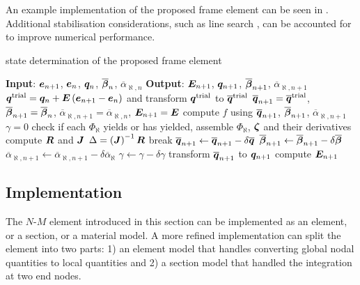 An example implementation of the proposed frame element can be seen in .
Additional stabilisation considerations, such as line search \cite{Dutko1993}, can be accounted for to improve numerical performance.
\begin{breakablealgorithm}
\caption{state determination of the proposed frame element}\label{algo:beam_model}
\begin{algorithmic}
\State \textbf{Input}: $\bm{e}_{n+1}$, $\bm{e}_n$, $\bm{q}_n$, $\overline{\bm{\beta}}_n$, $\overline{\alpha}_{\aleph,n}$
\State \textbf{Output}: $\bm{E}_{n+1}$, $\bm{q}_{n+1}$, $\overline{\bm{\beta}}_{n+1}$, $\overline{\alpha}_{\aleph,n+1}$
\State $\bm{q}^\text{trial}=\bm{q}_n+\bm{E}\left(\bm{e}_{n+1}-\bm{e}_n\right)$ and transform $\bm{q}^\text{trial}$ to $\overline{\bm{q}}^\text{trial}$
\State $\overline{\bm{q}}_{n+1}=\overline{\bm{q}}^\text{trial}$, $\overline{\bm{\beta}}_{n+1}=\overline{\bm{\beta}}_n$, $\overline{\alpha}_{\aleph,n+1}=\overline{\alpha}_{\aleph,n}$, $\bm{E}_{n+1}=\bm{E}$
\State compute $f$ using $\overline{\bm{q}}_{n+1}$, $\overline{\bm{\beta}}_{n+1}$, $\overline{\alpha}_{\aleph,n+1}$
\State $\gamma=0$
\State check if each $\Phi_\aleph$ yields or has yielded, assemble $\Phi_\aleph$, $\bm{\zeta}$ and their derivatives
\State compute $\bm{R}$ and $\bm{J}$
\State $\Delta=\left(\bm{J}\right)^{-1}\bm{R}$
\State break
\EndIf
\State $\overline{\bm{q}}_{n+1}\leftarrow\overline{\bm{q}}_{n+1}-\delta\overline{\bm{q}}$
\State $\overline{\bm{\beta}}_{n+1}\leftarrow\overline{\bm{\beta}}_{n+1}-\delta\overline{\bm{\beta}}$
\State $\overline{\alpha}_{\aleph,n+1}\leftarrow\overline{\alpha}_{\aleph,n+1}-\delta\overline{\alpha}_{\aleph}$
\State $\gamma\leftarrow\gamma-\delta\gamma$
\EndWhile
\State transform $\overline{\bm{q}}_{n+1}$ to $\bm{q}_{n+1}$
\State compute $\bm{E}_{n+1}$
\EndIf
\end{algorithmic}
\end{breakablealgorithm}
\subsection{Implementation}
The $N$-$M$ element introduced in this section can be implemented as an element, or a section, or a material model. A more refined implementation can split the element into two parts: 1) an element model that handles converting global nodal quantities to local quantities  and 2) a section model that handled the integration at two end nodes.
